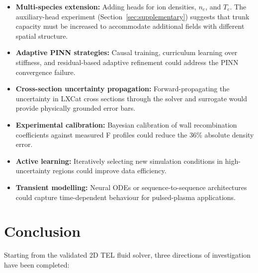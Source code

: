 \documentclass[12pt,a4paper]{article}
\begin{document}
\begin{itemize}
  \item \textbf{Multi-species extension:} Adding heads for ion
        densities, $n_e$, and $T_e$.  The auxiliary-head experiment
        (Section~\ref{sec:supplementary}) suggests that trunk capacity
        must be increased to accommodate additional fields with
        different spatial structure.

  \item \textbf{Adaptive PINN strategies:}  Causal training,
        curriculum learning over stiffness, and residual-based
        adaptive refinement could address the PINN convergence failure.

  \item \textbf{Cross-section uncertainty propagation:}
        Forward-propagating the uncertainty in LXCat cross sections
        through the solver and surrogate would provide physically
        grounded error bars.

  \item \textbf{Experimental calibration:}  Bayesian calibration
        of wall recombination coefficients against measured F profiles
        could reduce the 36\% absolute density error.

  \item \textbf{Active learning:}  Iteratively selecting new
        simulation conditions in high-uncertainty regions could improve
        data efficiency.

  \item \textbf{Transient modelling:}  Neural ODEs or
        sequence-to-sequence architectures could capture time-dependent
        behaviour for pulsed-plasma applications.
\end{itemize}

\section{Conclusion}
\label{sec:conclusion}

Starting from the validated 2D TEL fluid solver, three directions of
investigation have been completed:
\end{document}
